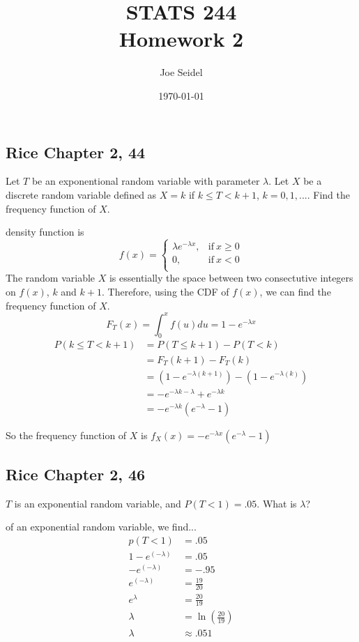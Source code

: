\documentclass{tufte-book}
\title{STATS 244 \\ Homework 2}
\author{Joe Seidel}
\date{\today}
\theoremstyle{mytheoremstyle}
\theoremstyle{mylemstyle}
\theoremstyle{mydefstyle}
\begin{document}
\maketitle
{}
\newpage
{}

\subsection{Rice Chapter 2, 44}
Let $T$ be an exponentional random variable with parameter $\lambda$.   Let $X$ be a discrete random variable defined as $X=k$ if $k \leq T <k+1$, $k=0,1,...$. Find the frequency function of $X$.

 density function is
\[ f(x)=
\begin{cases}
      \lambda e^{-\lambda x},  & \text{if}\ x \geq 0\\
      0, & \text{if}\ x<0\\
\end{cases}
\]
The random variable $X$ is essentially the space between two consectutive integers on $f(x)$, $k$ and $k+1$.  Therefore, using the CDF of $f(x)$, we can find the frequency function of $X$.
\[F_T(x)=\int_{0}^{x}f(u)du=1-e^{-\lambda x}\]
\begin{align*}
P(k\leq T<k+1) &= P(T \leq k+1) - P(T<k)\\
&= F_T(k+1) - F_T(k)\\
&= (1-e^{-\lambda(k+1)}) - (1-e^{-\lambda(k)})\\
&= -e^{-\lambda k- \lambda}+e^{-\lambda k}\\
&= -e^{-\lambda k}(e^{-\lambda}-1)
\end{align*}

So the frequency function of $X$ is $f_X(x)=  -e^{-\lambda x}(e^{-\lambda}-1)$


\subsection{Rice Chapter 2, 46}
$T$ is an exponential random variable, and $P(T<1) = .05$.  What is $\lambda$?

 of an exponential random variable, we find...
\begin{align*}
p(T<1)&=.05\\
1-e^{(-\lambda)} &= .05\\
-e^{(-\lambda)} &= -.95\\
e^{(-\lambda)} &= \frac{19}{20}\\
e^{\lambda} &= \frac{20}{19}\\
\lambda &= \ln(\frac{20}{19})\\
\lambda &\approx .051
\end{align*}
\end{document}

